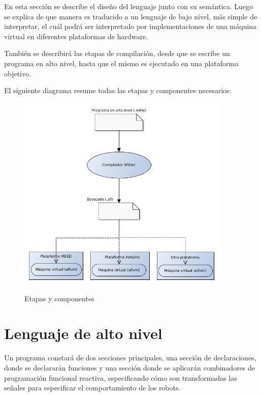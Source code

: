 En esta sección se describe el diseño del lenguaje junto con su semántica.
Luego se explica de que manera es traducido a un lenguaje de bajo nivel, más
simple de interpretar, el cuál podrá ser interpretado por implementaciones de
una máquina virtual en diferentes plataformas de hardware.

También se describirá las etapas de compilación, desde que se escribe
un programa en alto nivel, hasta que el mismo es ejecutado en una
plataforma objetivo.

El siguiente diagrama resume todas las etapas y componentes necesarios:

\begin{figure}[hbtp]
\begin{center}
\caption{Etapas y componentes}
\includegraphics[width=0.9\textwidth]{graphs/compilacion.png}
\label{fig:compilacion}
\end{center}
\end{figure}

\section{Lenguaje de alto nivel}

  Un programa constará de dos secciones principales, una sección de declaraciones, donde
se declararán funciones y una sección donde se aplicarán combinadores de programación
funcional reactiva, especificando cómo son transformadas las señales para especificar
el comportamiento de los robots.

